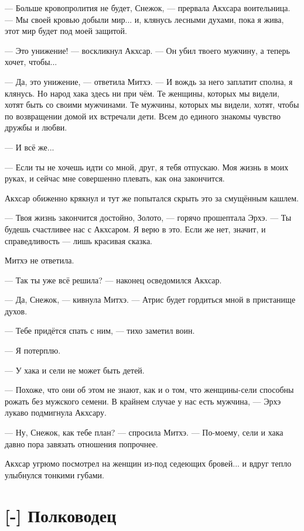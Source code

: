 --- Больше кровопролития не будет, Снежок, --- прервала Акхсара воительница.
--- Мы своей кровью добыли мир... и, клянусь лесными духами, пока я жива, этот мир будет под моей защитой.

--- Это унижение! --- воскликнул Акхсар.
--- Он убил твоего мужчину, а теперь хочет, чтобы...

--- Да, это унижение, --- ответила Митхэ.
--- И вождь за него заплатит сполна, я клянусь.
Но народ хака здесь ни при чём.
Те женщины, которых мы видели, хотят быть со своими мужчинами.
Те мужчины, которых мы видели, хотят, чтобы по возвращении домой их встречали дети.
Всем до единого знакомы чувство дружбы и любви.

--- И всё же...

--- Если ты не хочешь идти со мной, друг, я тебя отпускаю.
Моя жизнь в моих руках, и сейчас мне совершенно плевать, как она закончится.

Акхсар обиженно крякнул и тут же попытался скрыть это за смущённым кашлем.

--- Твоя жизнь закончится достойно, Золото, --- горячо прошептала Эрхэ.
--- Ты будешь счастливее нас с Акхсаром.
Я верю в это.
Если же нет, значит, и справедливость --- лишь красивая сказка.

Митхэ не ответила.

--- Так ты уже всё решила? --- наконец осведомился Акхсар.

--- Да, Снежок, --- кивнула Митхэ.
--- Атрис будет гордиться мной в пристанище духов.

--- Тебе придётся спать с ним, --- тихо заметил воин.

--- Я потерплю.

--- У хака и сели не может быть детей.

--- Похоже, что они об этом не знают, как и о том, что женщины-сели способны рожать без мужского семени.
В крайнем случае у нас есть мужчина, --- Эрхэ лукаво подмигнула Акхсару.

--- Ну, Снежок, как тебе план? --- спросила Митхэ.
--- По-моему, сели и хака давно пора завязать отношения попрочнее.

Акхсар угрюмо посмотрел на женщин из-под седеющих бровей... и вдруг тепло улыбнулся тонкими губами.

\section{[-] Полководец}

\textspace

